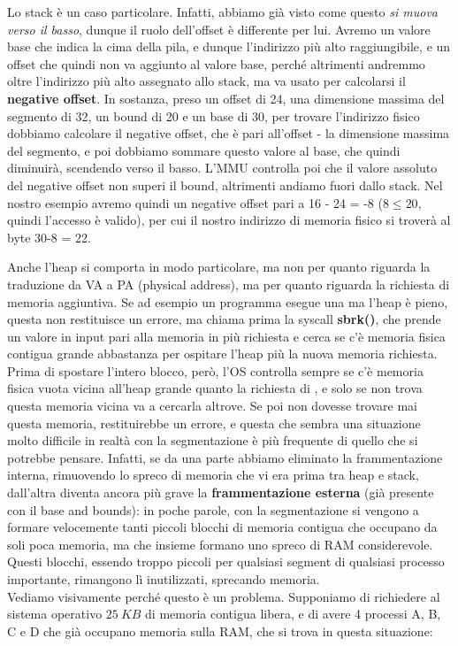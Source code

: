 \documentclass[11pt, a4paper, titlepage, oneside]{scrbook}
\begin{document}
Lo stack è un caso particolare. Infatti, abbiamo già visto come questo \textit{si muova verso il basso}, dunque il ruolo dell'offset è differente per lui. Avremo un valore base che indica la cima della pila, e dunque l'indirizzo più alto raggiungibile, e un offset che quindi non va aggiunto al valore base, perché altrimenti andremmo oltre l'indirizzo più alto assegnato allo stack, ma va usato per calcolarsi il \textbf{negative offset}. In sostanza, preso un offset di 24, una dimensione massima del segmento di 32, un bound di 20 e un base di 30, per trovare l'indirizzo fisico dobbiamo calcolare il negative offset, che è pari all'offset - la dimensione massima del segmento, e poi dobbiamo sommare questo valore al base, che quindi diminuirà, scendendo verso il basso. L'MMU controlla poi che il valore assoluto del negative offset non superi il bound, altrimenti andiamo fuori dallo stack. Nel nostro esempio avremo quindi un negative offset pari a 16 - 24 = -8 ($8 \leq 20$, quindi l'accesso è valido), per cui il nostro indirizzo di memoria fisico si troverà al byte 30-8 = 22.

Anche l'heap si comporta in modo particolare, ma non per quanto riguarda la traduzione da VA a PA (physical address), ma per quanto riguarda la richiesta di memoria aggiuntiva. Se ad esempio un programma esegue una  ma l'heap è pieno, questa non restituisce un errore, ma chiama prima la syscall \textbf{sbrk()}, che prende un valore in input pari alla memoria in più richiesta e cerca se c'è memoria fisica contigua grande abbastanza per ospitare l'heap più la nuova memoria richiesta. Prima di spostare l'intero blocco, però, l'OS controlla sempre se c'è memoria fisica vuota vicina all'heap grande quanto la richiesta di , e solo se non trova questa memoria vicina va a cercarla altrove. Se poi non dovesse trovare mai questa memoria, restituirebbe un errore, e questa che sembra una situazione molto difficile in realtà con la segmentazione è più frequente di quello che si potrebbe pensare. Infatti, se da una parte abbiamo eliminato la frammentazione interna, rimuovendo lo spreco di memoria che vi era prima tra heap e stack, dall'altra diventa ancora più grave la \textbf{frammentazione esterna} (già presente con il base and bounds): in poche parole, con la segmentazione si vengono a formare velocemente tanti piccoli blocchi di memoria contigua che occupano da soli poca memoria, ma che insieme formano uno spreco di RAM considerevole. Questi blocchi, essendo troppo piccoli per qualsiasi segment di qualsiasi processo importante, rimangono lì inutilizzati, sprecando memoria. \\ 
Vediamo visivamente perché questo è un problema. Supponiamo di richiedere al sistema operativo $\SI{25}{KB}$ di memoria contigua libera, e di avere 4 processi A, B, C e D che già occupano memoria sulla RAM, che si trova in questa situazione:
\end{document}
